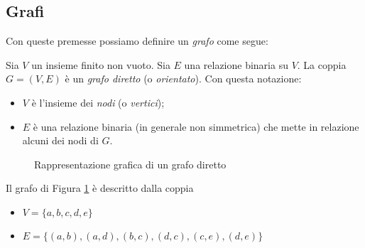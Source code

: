 \subsection{Grafi}
Con queste premesse possiamo definire un \emph{grafo} come segue:
\begin{definition}
    Sia $V$ un insieme finito non vuoto. Sia $E$ una relazione binaria su $V$. La coppia $G = (V, E)$ è un \emph{grafo diretto} (o \emph{orientato}). Con questa notazione:
    \begin{itemize}
        \item $V$ è l'insieme dei \emph{nodi} (o \emph{vertici});
        \item $E$ è una relazione binaria (in generale non simmetrica) che mette in relazione alcuni dei nodi di $G$.
    \end{itemize}
\end{definition}
\begin{example}
    \begin{figure}[t]
        \centering
        \caption{Rappresentazione grafica di un grafo diretto}
        \label{fig:graph}
    \end{figure}
    Il grafo di Figura \ref{fig:graph} è descritto dalla coppia
    \begin{itemize}
        \item $V = \{a,b,c,d,e\}$
        \item $E = \{(a,b), (a,d), (b,c), (d,c), (c,e), (d,e)\}$
    \end{itemize}
\end{example}
